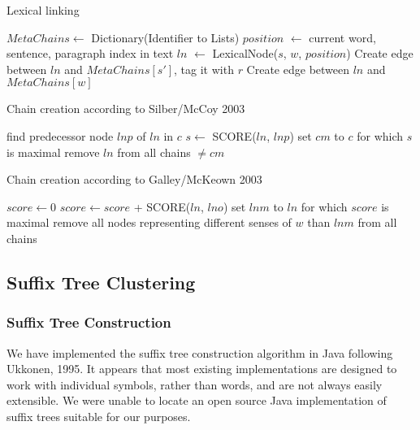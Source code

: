 \documentclass[11pt, a4paper, abstraction]{scrartcl}
\begin{document}
\begin{algorithm}
\caption{Lexical linking}
\begin{algorithmic}
	\STATE $MetaChains \gets$ Dictionary(Identifier to Lists)
		\STATE $position$ $\gets$ current word, sentence, paragraph index in text
				\STATE $ln$ $\gets$ LexicalNode($s$, $w$, $position$)
					\STATE Create edge between $ln$ and $MetaChains[s']$, tag it with $r$
				\ENDFOR
			\ENDFOR
		\ELSE
			\STATE Create edge between $ln$ and $MetaChains[w]$
		\ENDIF
	\ENDFOR
\end{algorithmic}
\end{algorithm}
\begin{algorithm}
\caption{Chain creation according to Silber/McCoy 2003}
\begin{algorithmic}
				\STATE find predecessor node $lnp$ of $ln$ in $c$
				\STATE $s \gets $ SCORE($ln$, $lnp$)
				\STATE set $cm$ to $c$ for which $s$ is maximal
			\ENDFOR
		\ENDFOR
		\STATE remove $ln$ from all chains $\neq cm$
	\ENDFOR
\end{algorithmic}
\end{algorithm}
\begin{algorithm}
\begin{algorithmic}
\caption{Chain creation according to Galley/McKeown 2003}
			\STATE $score \gets 0$
					\STATE $score \gets score$ + SCORE($ln$, $lno$)
				\ENDFOR
			\ENDFOR
			\STATE set $lnm$ to $ln$ for which $score$ is maximal 
		\ENDFOR
		\STATE remove all nodes representing different senses of $w$ than $lnm$ from all chains
	\ENDFOR 
\end{algorithmic}
\end{algorithm}

\subsection{Suffix Tree Clustering}

\subsubsection{Suffix Tree Construction}
We have implemented the suffix tree construction algorithm in Java following Ukkonen, 1995. It appears that most existing implementations are designed to work with individual symbols, rather than words, and are not always easily extensible. We were unable to locate an open source Java implementation of suffix trees suitable for our purposes. 
\end{document}
